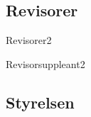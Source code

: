 \documentclass[10pt]{article}
\begin{document}
    \subsection{Revisorer}
    
    \begin{vallista}
        \begin{post}{Revisorer}{2}
            \vakant
        \end{post}
        \begin{post}{Revisorsuppleant}{2}
            \vakant
        \end{post}
    \end{vallista}
    
    \subsection{Styrelsen}
    
\end{document}
